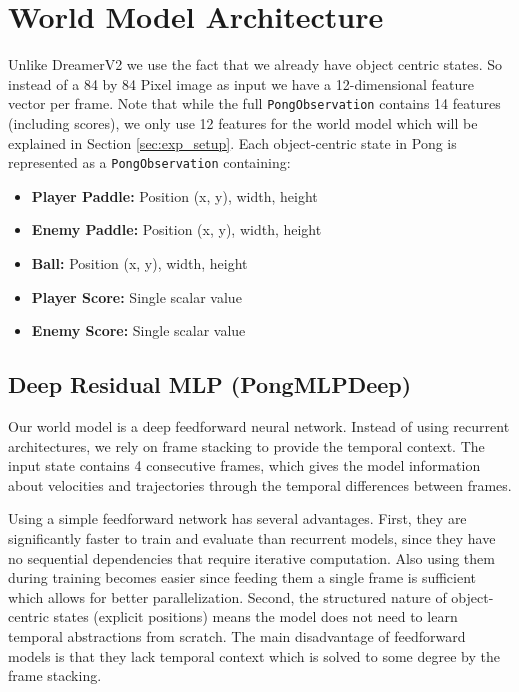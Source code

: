 \documentclass[
	english,
	ruledheaders=section,
	class=report,
	thesis={type=master},
	accentcolor=9c,
	custommargins=true,
	marginpar=false,
	parskip=half-,
	fontsize=11pt,
	pdfa=true,
]{tudapub}
\newcommand{\worldmodel}{world model}
\begin{document}
\section{World Model Architecture} \label{sec:world_model_arch}

Unlike DreamerV2 we use the fact that we already
have object centric states. So instead of a 84 by 84 Pixel image as input we have
a 12-dimensional feature vector per frame. Note that while the full
\texttt{PongObservation} contains 14 features (including scores), we only use
12 features for the \worldmodel{} which will be explained in Section
\ref{sec:exp_setup}. Each object-centric state in Pong is represented as a
\texttt{PongObservation} containing:
\begin{itemize}
	\item \textbf{Player Paddle:} Position (x, y), width, height
	\item \textbf{Enemy Paddle:} Position (x, y), width, height
	\item \textbf{Ball:} Position (x, y), width, height
	\item \textbf{Player Score:} Single scalar value
	\item \textbf{Enemy Score:} Single scalar value
\end{itemize}

\subsection{Deep Residual MLP (PongMLPDeep)}
\label{subsec:pongmlp}

Our \worldmodel{} is a deep feedforward neural network. Instead of using
recurrent architectures, we rely on frame stacking to provide the temporal
context. The input state contains 4 consecutive frames, which gives the model
information about velocities and trajectories through the temporal differences
between frames.

Using a simple feedforward network has several advantages. First, they are
significantly faster to train and evaluate than recurrent models, since they
have no sequential dependencies that require iterative computation.
Also using them during training becomes easier
since feeding them a single frame is sufficient which allows for better
parallelization. Second, the structured nature of object-centric states
(explicit positions) means the model does not need to learn temporal
abstractions from scratch. The main disadvantage of
feedforward models is that they lack temporal context which is solved to some
degree by the frame stacking.
\end{document}
